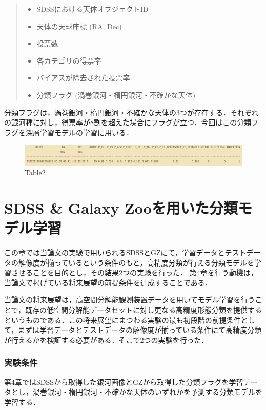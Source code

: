 \documentclass[a4j, 11pt]{jarticle}
\begin{document}
\begin{quote}
 \begin{itemize}
	\item SDSSにおける天体オブジェクトID
	\item 天体の天球座標 (RA, Dec)
	\item 投票数
	\item 各カテゴリの得票率
	\item バイアスが除去された投票率
	\item 分類フラグ (渦巻銀河・楕円銀河・不確かな天体)
 \end{itemize}
\end{quote}

分類フラグは，渦巻銀河・楕円銀河・不確かな天体の3つが存在する．それぞれの銀河種に対し，得票率が8割を超えた場合にフラグが立つ．今回はこの分類フラグを深層学習モデルの学習に用いる．

\begin{figure}[h]
 \centering
 \includegraphics[width=18cm]{images/table2.png}
 \caption{Table2}
 \label{fig:table2}
\end{figure}

\newpage
\section{SDSS \& Galaxy Zooを用いた分類モデル学習}
この章では当論文の実験で用いられるSDSSとGZにて，学習データとテストデータの解像度が揃っているという条件のもと，高精度分類が行える分類モデルを学習させることを目的とし，その結果2つの実験を行った．
第4章を行う動機は，当論文で掲げている将来展望の前提条件を達成することである．

当論文の将来展望は，高空間分解能観測装置データを用いてモデル学習を行うことで，既存の低空間分解能データセットに対し更なる高精度形態分類を提供するというものである．この将来展望にまつわる実験の最も初段階の前提条件として，まずは学習データとテストデータの解像度が揃っている条件にて高精度分類が行えるかを検証する必要がある．そこで2つの実験を行った．

\subsubsection*{実験条件}
第4章ではSDSSから取得した銀河画像とGZから取得した分類フラグを学習データとし，渦巻銀河・楕円銀河・不確かな天体のいずれかを予測する分類モデルを学習する．
\end{document}
